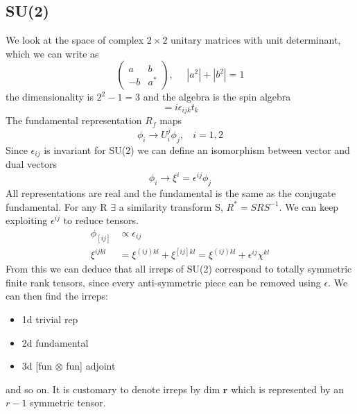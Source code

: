 \documentclass[a4paper,12pt]{article}
\begin{document}
\subsection{SU(2)}
We look at the space of complex $2\times 2$ unitary matrices with unit determinant, which we can write as
\begin{equation}
\begin{pmatrix}
a & b \\ -b & a^*
\end{pmatrix},~~~~~~|a^2|+|b^2|=1
\end{equation}
the dimensionality is $2^2-1=3$ and the algebra is the spin algebra
\begin{equation}
[t_i,t_j]=i \epsilon_{ijk}t_k
\end{equation}
The fundamental representation $R_f$ maps
\begin{equation}
\phi_i\to U_i^j \phi_j,~~~~i=1,2
\end{equation}
Since $\epsilon_{ij}$ is invariant for SU(2) we can define an isomorphism between vector and dual vectors
\begin{equation}
\phi_i\to\xi ^i=\epsilon^{ij}\phi_j
\end{equation}
All representations are real and the fundamental is the same as the conjugate fundamental. For any R $\exists$ a similarity transform S, $R^*=S R S^{-1}$.
We can keep exploiting $\epsilon^{ij}$ to reduce tensors. 
\begin{equation}
\begin{aligned}
\phi_{[ij]}&\propto \epsilon_{ij}\\
 \xi^{ijkl}&=\xi^{(ij)kl}+\xi^{[ij]kl}=\xi^{(ij)kl}+\epsilon^{ij}\chi^{kl}
\end{aligned}
\end{equation}
From this we can deduce that all irreps of SU(2) correspond to totally symmetric finite rank tensors, since every anti-symmetric piece can be removed using $\epsilon$. We can then find the irreps:
\begin{itemize}
	\item 1d trivial rep
	\item 2d fundamental
	\item 3d [fun $\otimes$ fun] adjoint 
\end{itemize}
and so on. It is customary to denote irreps by dim $\bm r$ which is represented by an $r-1$ symmetric tensor.
\end{document}
